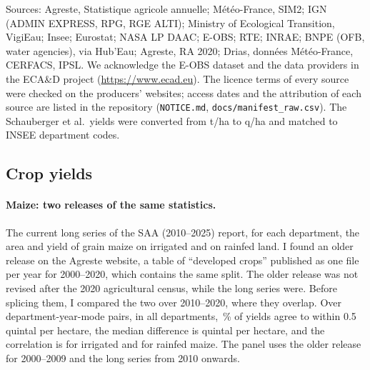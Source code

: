 \begin{table}[tp]
\smallskip
\begin{minipage}{\linewidth}\scriptsize
Sources: Agreste, Statistique agricole annuelle; Météo-France, SIM2; IGN (ADMIN EXPRESS, RPG, RGE ALTI); Ministry of Ecological Transition, VigiEau; Insee; Eurostat; NASA LP DAAC; E-OBS; RTE; INRAE; BNPE (OFB, water agencies), via Hub'Eau; Agreste, RA 2020; Drias, données Météo-France, CERFACS, IPSL. We acknowledge the E-OBS dataset and the data providers in the ECA\&D project (\url{https://www.ecad.eu}). The licence terms of every source were checked on the producers' websites; access dates and the attribution of each source are listed in the repository (\texttt{NOTICE.md}, \texttt{docs/manifest\_raw.csv}). The Schauberger et al.\ yields were converted from t/ha to q/ha and matched to INSEE department codes.
\end{minipage}
\end{table}


\subsection{Crop yields}

\paragraph{Maize: two releases of the same statistics.} The current long series of the SAA (2010--2025) report, for each department, the area and yield of grain maize on irrigated and on rainfed land. I found an older release on the Agreste website, a table of ``developed crops'' published as one file per year for 2000--2020, which contains the same split. The older release was not revised after the 2020 agricultural census, while the long series were. Before splicing them, I compared the two over 2010--2020, where they overlap. Over \SpliceN{} department-year-mode pairs, in all departments, \SpliceShare\,\% of yields agree to within 0.5 quintal per hectare, the median difference is \SpliceMedian{} quintal per hectare, and the correlation is \SpliceCorrIrr{} for irrigated and \SpliceCorrRain{} for rainfed maize. The panel uses the older release for 2000--2009 and the long series from 2010 onwards.

